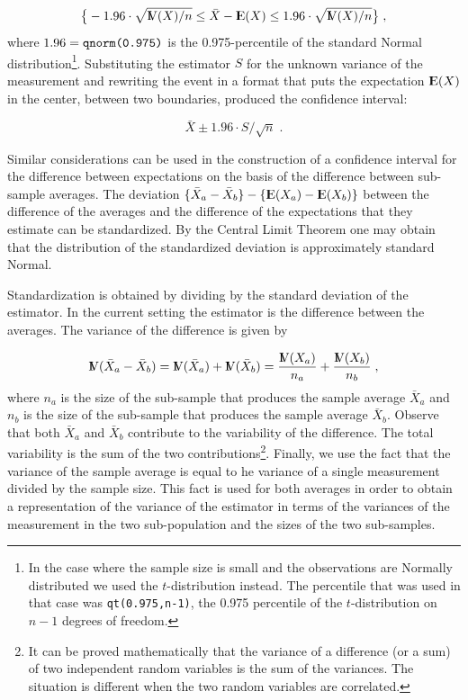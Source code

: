 \documentclass[]{krantz}
\newcommand{\Expec}{{\rm I\kern-.3em E}}
\newcommand{\Var}{{\rm I\kern-.3em V}}
\theoremstyle{definition}
\theoremstyle{definition}
\theoremstyle{definition}
\theoremstyle{remark}
\begin{document}
\[\big\{-1.96 \cdot \sqrt{\Var(X)/n} \leq \bar X - \Expec(X) \leq 1.96 \cdot \sqrt{\Var(X)/n}\big\}\;,\]
where \(1.96 = \mbox{\texttt{qnorm(0.975)}}\) is the 0.975-percentile of
the standard Normal distribution\footnote{In the case where the sample
  size is small and the observations are Normally distributed we used
  the \(t\)-distribution instead. The percentile that was used in that
  case was \texttt{qt(0.975,n-1)}, the 0.975 percentile of the
  \(t\)-distribution on \(n-1\) degrees of freedom.}. Substituting the
estimator \(S\) for the unknown variance of the measurement and
rewriting the event in a format that puts the expectation \(\Expec(X)\)
in the center, between two boundaries, produced the confidence interval:

\[\bar X \pm 1.96 \cdot S/\sqrt{n}\;.\]

Similar considerations can be used in the construction of a confidence
interval for the difference between expectations on the basis of the
difference between sub-sample averages. The deviation
\(\{\bar X_a- \bar X_b\} - \{\Expec(X_a)- \Expec(X_b)\}\) between the
difference of the averages and the difference of the expectations that
they estimate can be standardized. By the Central Limit Theorem one may
obtain that the distribution of the standardized deviation is
approximately standard Normal.

Standardization is obtained by dividing by the standard deviation of the
estimator. In the current setting the estimator is the difference
between the averages. The variance of the difference is given by

\[\Var(\bar X_a- \bar X_b) = \Var(\bar X_a) + \Var(\bar X_b) = \frac{\Var(X_a)}{n_a} + \frac{\Var(X_b)}{n_b}\;,\]
where \(n_a\) is the size of the sub-sample that produces the sample
average \(\bar X_a\) and \(n_b\) is the size of the sub-sample that
produces the sample average \(\bar X_b\). Observe that both \(\bar X_a\)
and \(\bar X_b\) contribute to the variability of the difference. The
total variability is the sum of the two contributions\footnote{It can be
  proved mathematically that the variance of a difference (or a sum) of
  two independent random variables is the sum of the variances. The
  situation is different when the two random variables are correlated.}.
Finally, we use the fact that the variance of the sample average is
equal to he variance of a single measurement divided by the sample size.
This fact is used for both averages in order to obtain a representation
of the variance of the estimator in terms of the variances of the
measurement in the two sub-population and the sizes of the two
sub-samples.
\end{document}
